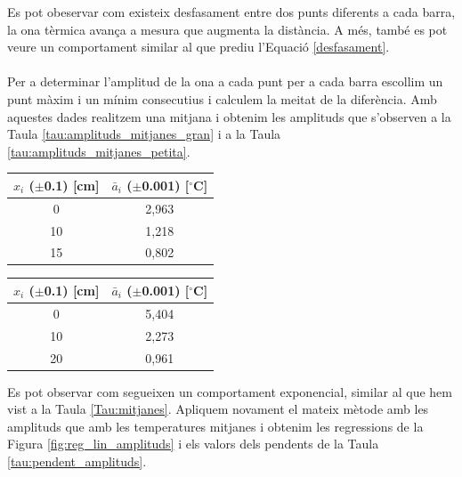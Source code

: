 \documentclass[12pt,twosides,onecolumn,openany]{article}
\newenvironment{Figura}
  {\par\medskip\noindent\minipage{\linewidth}}
  {\endminipage\par\medskip}
\begin{document}
\begin{multicols}{2}
\begin{Figura}
  \label{fig:T_vs_t_petita_norm}
\end{Figura}
Es pot obeservar com existeix desfasament entre dos punts diferents a cada barra, la ona tèrmica avança a mesura que augmenta la distància. A més, també es pot veure un comportament similar al que prediu l'Equació \eqref{desfasament}.\\\\
Per a determinar l'amplitud de la ona a cada punt per a cada barra escollim un punt màxim i un mínim consecutius i calculem la meitat de la diferència. Amb aquestes dades realitzem una mitjana i obtenim les amplituds que s'observen a la Taula \ref{tau:amplituds_mitjanes_gran} i a la Taula \ref{tau:amplituds_mitjanes_petita}.
\begin{Figura}
  \centering
  \begin{tabular}{c|c}
    $x_i$ ($\pm$0.1) [cm] & $\bar{a}_i$ ($\pm$0.001) [$^\circ$C]  \\ \hline
    0 & 2,963\\
    10 & 1,218\\
    15 & 0,802 
  \end{tabular}
  \label{tau:amplituds_mitjanes_gran}
\end{Figura} 
\begin{Figura}
  \centering
  \begin{tabular}{c|c}
    $x_i$ ($\pm$0.1) [cm] & $\bar{a}_i$ ($\pm$0.001) [$^\circ$C]  \\ \hline
    0 & 5,404\\
    10 & 2,273\\
    20 & 0,961  
  \end{tabular}
  \label{tau:amplituds_mitjanes_gran}
\end{Figura} 
Es pot observar com segueixen un comportament exponencial, similar al que hem vist a la Taula \ref{Tau:mitjanes}. Apliquem novament el mateix mètode amb les amplituds que amb les temperatures mitjanes i obtenim les regressions de la Figura \ref{fig:reg_lin_amplituds} i els valors dels pendents de la Taula \ref{tau:pendent_amplituds}.


\end{multicols}
\end{document}
